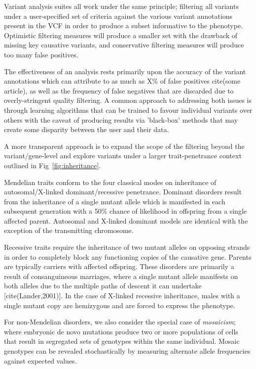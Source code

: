 Variant analysis suites all work under the same principle; filtering all variants under a user-specified set of criteria against the various variant annotations present in the VCF in order to produce a subset informative to the phenotype. Optimistic filtering measures will produce a smaller set with the drawback of missing key causative variants, and conservative filtering measures will produce too many false positives.

The effectiveness of an analysis rests primarily upon the accuracy of the variant annotations which can attribute to as much as X\% of false positives cite(some article), as well as the frequency of false negatives that are discarded due to overly-stringent quality filtering. A common approach to addressing both issues is through learning algorithms that can be trained to favour individual variants over others with the caveat of producing results via 'black-box' methods that may create some disparity between the user and their data. 

A more transparent approach is to expand the scope of the filtering beyond the variant/gene-level and explore variants under a larger trait-penetrance context outlined in Fig~\ref{fig:inheritance}. 

Mendelian traits conform to the four classical modes on inheritance of autosomal/X-linked dominant/recessive penetrance. Dominant disorders result from the inheritance of a single mutant allele which is manifested in each subsequent generation with a 50\% chance of likelihood in offspring from a single affected parent. Autosomal and X-linked dominant models are identical with the exception of the transmitting chromosome.

Recessive traits require the inheritance of two mutant alleles on opposing strands in order to completely block any functioning copies of the causative gene. Parents are typically carriers with affected offspring. These disorders are primarily a result of consanguineous marriages, where a single mutant allele manifests on both alleles due to the multiple paths of descent it can undertake [cite(Lander,2001)]. In the case of X-linked recessive inheritance, males with a single mutant copy are hemizygous and are forced to express the phenotype.

For non-Mendelian disorders, we also consider the special case of \textit{mosaicism}; where embryonic de novo mutations produce two or more populations of cells that result in segregated sets of genotypes within the same individual. Mosaic genotypes can be revealed stochastically by measuring alternate allele frequencies against expected values.

